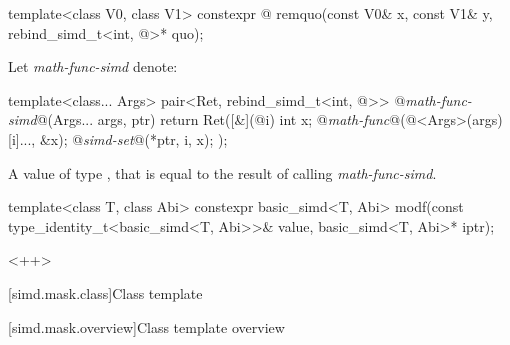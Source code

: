 \begin{itemdecl}
template<class V0, class V1>
  constexpr @ remquo(const V0& x, const V1& y,
                                              rebind_simd_t<int, @>* quo);
\end{itemdecl}
\begin{itemdescr}
  \pnum
  Let \textit{math-func-simd} denote:
  \begin{codeblock}
template<class... Args>
pair<Ret, rebind_simd_t<int, @>>
@\textit{math-func-simd}@(Args... args, ptr) {
  return Ret([&](@\simdsizetype@ i) {
      int x;
      @\textit{math-func}@(@\deducedsimd@<Args>(args)[i]..., &x);
      @\textit{simd-set}@(*ptr, i, x);
  });
}
  \end{codeblock}

  \pnum\effects

  \pnum\returns
  A value  of type , that is equal to the result of calling
  \textit{math-func-simd}.
\end{itemdescr}

\begin{itemdecl}
template<class T, class Abi>
  constexpr basic_simd<T, Abi> modf(const type_identity_t<basic_simd<T, Abi>>& value,
                                    basic_simd<T, Abi>* iptr);
\end{itemdecl}
\begin{itemdescr}
  <++>
\end{itemdescr}



[simd.mask.class]{Class template }

[simd.mask.overview]{Class template  overview}

